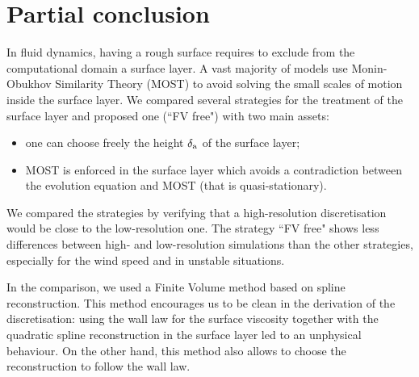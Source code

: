 \section{Partial conclusion}
In fluid dynamics, having a rough surface requires to exclude from
the computational domain a surface layer. A vast majority of models
use Monin-Obukhov Similarity Theory (MOST)
to avoid solving the small scales of motion inside the surface layer.
We compared several strategies for the treatment of the surface layer
and proposed one (``FV free") with two main assets:
\begin{itemize}
	\item one can choose freely the height $\delta_{\rm a}$
		of the surface layer;
	\item MOST is enforced in the surface layer which avoids
		a contradiction between the evolution equation and
		MOST (that is quasi-stationary).
\end{itemize}
We compared the strategies by verifying that a high-resolution
discretisation would be close to the low-resolution one.
The strategy ``FV free" shows less differences between
high- and low-resolution simulations than the other strategies,
especially for the wind speed and in unstable situations.
\par
In the comparison, we used a Finite Volume method based on spline
reconstruction. This method encourages us to be
clean in the derivation of the discretisation: using the wall law
for the surface viscosity together with the quadratic spline
reconstruction in the surface layer led to an unphysical behaviour.
On the other hand, this method also allows to choose the
reconstruction to follow the wall law.
